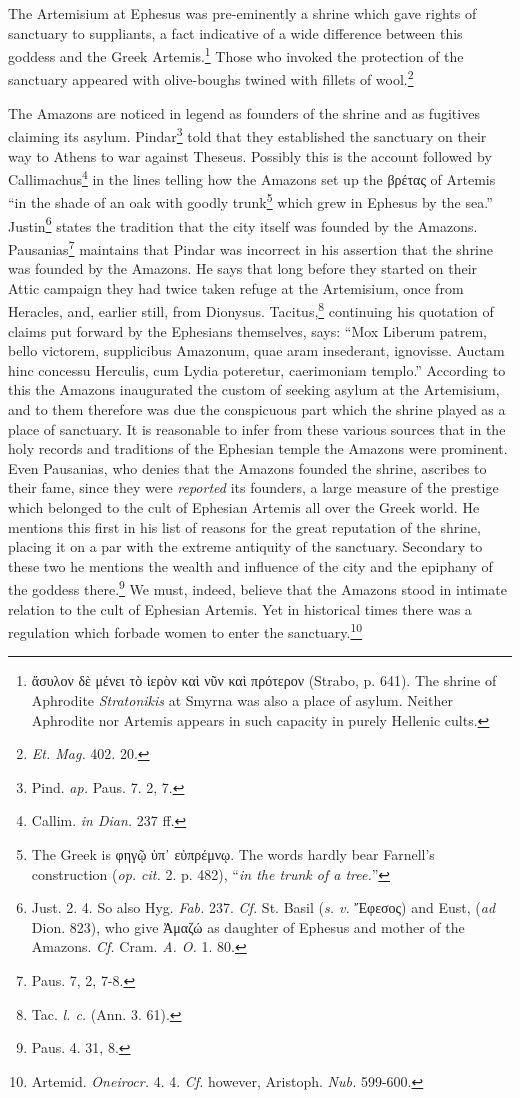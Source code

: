 \documentclass[a4paper, 12pt, oneside]{article}
\begin{document}
The Artemisium at Ephesus was pre-eminently a shrine which gave rights of sanctuary to suppliants, a fact indicative of a wide difference between this goddess and the Greek Artemis.\footnote{ἄσυλον δὲ μένει τὸ ἱερὸν καὶ νῦν καὶ πρότερον (Strabo, p. 641). The shrine of Aphrodite \emph{Stratonikis} at Smyrna was also a place of asylum. Neither Aphrodite nor Artemis appears in such capacity in purely Hellenic cults.} Those who invoked the protection of the sanctuary appeared with olive-boughs twined with fillets of wool.\footnote{\emph{Et. Mag.} 402. 20.}

The Amazons are noticed in legend as founders of the shrine and as fugitives claiming its asylum. Pindar\footnote{Pind. \emph{ap.} Paus. 7. 2, 7.} told that they established the sanctuary on their way to Athens to war against Theseus. Possibly this is the account followed by Callimachus\footnote{Callim. \emph{in Dian.} 237 ff.} in the lines telling how the Amazons set up the βρέτας of Artemis ``in the shade of an oak with goodly trunk\footnote{The Greek is φηγῷ ὑπ᾽ εὐπρέμνῳ. The words hardly bear Farnell's construction (\emph{op. cit.} 2. p. 482), ``\emph{in the trunk of a tree.}''} which grew in Ephesus by the sea.'' Justin\footnote{Just. 2. 4. So also Hyg. \emph{Fab.} 237. \emph{Cf.} St. Basil (\emph{s. v.} Ἔφεσος) and Eust, (\emph{ad} Dion. 823), who give Ἀμαζώ as daughter of Ephesus and mother of the Amazons. \emph{Cf.} Cram. \emph{A. O.} 1. 80.} states the tradition that the city itself was founded by the Amazons. Pausanias\footnote{Paus. 7, 2, 7-8.} maintains that Pindar was incorrect in his assertion that the shrine was founded by the Amazons. He says that long before they started on their Attic campaign they had twice taken refuge at the Artemisium, once from Heracles, and, earlier still, from Dionysus. Tacitus,\footnote{Tac. \emph{l. c.} (Ann. 3. 61).} continuing his quotation of claims put forward by the Ephesians themselves, says: ``Mox Liberum patrem, bello victorem, supplicibus Amazonum, quae aram insederant, ignovisse. Auctam hinc concessu Herculis, cum Lydia poteretur, caerimoniam templo.'' According to this the Amazons inaugurated the custom of seeking asylum at the Artemisium, and to them therefore was due the conspicuous part which the shrine played as a place of sanctuary. It is reasonable to infer from these various sources that in the holy records and traditions of the Ephesian temple the Amazons were prominent. Even Pausanias, who denies that the Amazons founded the shrine, ascribes to their fame, since they were \emph{reported} its founders, a large measure of the prestige which belonged to the cult of Ephesian Artemis all over the Greek world. He mentions this first in his list of reasons for the great reputation of the shrine, placing it on a par with the extreme antiquity of the sanctuary. Secondary to these two he mentions the wealth and influence of the city and the epiphany of the goddess there.\footnote{Paus. 4. 31, 8.} We must, indeed, believe that the Amazons stood in intimate relation to the cult of Ephesian Artemis. Yet in historical times there was a regulation which forbade women to enter the sanctuary.\footnote{Artemid. \emph{Oneirocr.} 4. 4. \emph{Cf.} however, Aristoph. \emph{Nub.} 599-600.}
\end{document}
